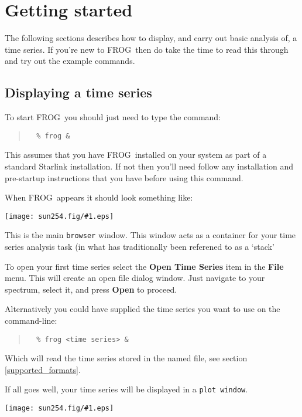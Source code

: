 \documentclass[twoside,11pt]{article}
\newcommand{\htmladdimg}[1]{}
\newcommand{\htmlref}[2]{#1}
\newcommand{\latex}[1]{#1}
\newcommand{\latexhtml}[2]{#1}
\newcommand{\xlabel}[1]{}
\renewcommand{\_}{\texttt{\symbol{95}}}
\newcommand{\FROG}{\textsf{FROG}}
\newcommand{\mainfigure}[1]
{\begin{center}
 \latexhtml{\texttt{[image: sun254.fig/\#1.eps]}}{\htmladdimg{../sun254.fig/#1.gif}}
 \end{center}
}
\newcommand{\menuitem}[1]{\textbf{#1}}
\newcommand{\hitext}[1]{\texttt{#1}}
\begin{document}
\section{Getting started\xlabel{getting_started}}

The following sections describes how to display, and carry out basic analysis of, a time series. If you're new to \FROG\ then do take the time to read this through and try out the example commands.

\subsection{Displaying a time series\xlabel{display_a_time_series}}

To start \FROG\ you should just need to type the command:
\begin{quote}
\begin{verbatim}
  % frog &
\end{verbatim}
\end{quote}
This assumes that you have \FROG\ installed on your system as part of a
standard Starlink installation. If not then you'll need follow any
installation and pre-startup instructions that you have before using
this command.

When \FROG\ appears it should look something like:

\mainfigure{main_window}

This is the main \hitext{browser} window. This window acts as a container for your time series analysis task (in what has traditionally been referened to as a `stack'

To open your first time series select the \menuitem{Open Time Series} item in the \menuitem{File} menu. This will create an  open file dialog window. Just navigate to your spectrum, select it, and press \menuitem{Open} to proceed.

Alternatively you could have supplied the time series you want to use on
the command-line:
\begin{quote}
\begin{verbatim}
  % frog <time series> &
\end{verbatim}
\end{quote}
Which will read the time series stored in the named \htmlref{file}{supported_formats}\latex{, see section \ref{supported_formats}}.

If all goes well, your time series will be displayed in a \hitext{plot window}.

\mainfigure{plot_window}
\end{document}
